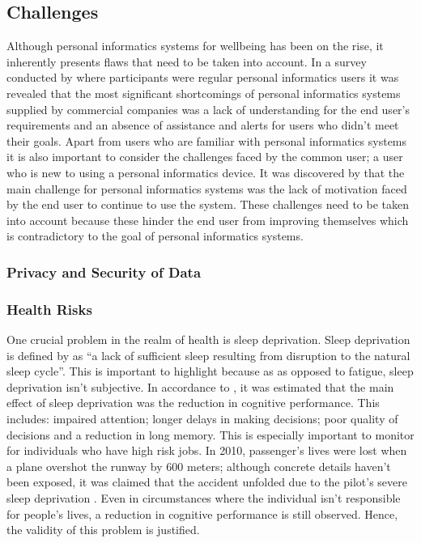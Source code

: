 \subsection{Challenges}
Although personal informatics systems for wellbeing has been on the rise, it inherently presents flaws that need to
be taken into account. In a survey conducted by \textcite{Rapp:2014aa} where participants were regular personal informatics users it was revealed
that the most significant shortcomings of personal informatics systems supplied by commercial companies was a lack of understanding
for the end user's requirements and an absence of assistance and alerts for users who didn't meet their goals.
Apart from users who are familiar with personal informatics systems it is also important to consider the challenges
faced by the common user; a user who is new to using a personal informatics device. It was discovered by \textcite{Rapp:2014aa} that the main
challenge for personal informatics systems was the lack of motivation faced by the end user to continue to use the system.
These challenges need to be taken into account because these hinder the end user from improving themselves which is contradictory
to the goal of personal informatics systems.

\subsubsection{Privacy and Security of Data}



\subsubsection{Health Risks}

One crucial problem in the realm of health is sleep deprivation. Sleep deprivation is defined by
\textcite{BMA:2018aa} as ``a lack of sufficient sleep resulting from disruption to the natural sleep
cycle''. This is important to highlight because as as opposed to fatigue, sleep deprivation isn't
subjective. In accordance to \textcite{Alhola:2007aa}, it was estimated that the main effect of
sleep deprivation was the reduction in cognitive performance. This includes: impaired attention;
longer delays in making decisions; poor quality of decisions and a reduction in long memory. This is
especially important to monitor for individuals who have high risk jobs. In 2010, passenger's lives
were lost when a plane overshot the runway by 600 meters; although concrete details haven't been
exposed, it was claimed that the accident unfolded due to the pilot's severe sleep deprivation
\parencite{BBC:2010aa}. Even in circumstances where the individual isn't responsible for people's
lives, a reduction in cognitive performance is still observed. Hence, the validity of this problem
is justified.

